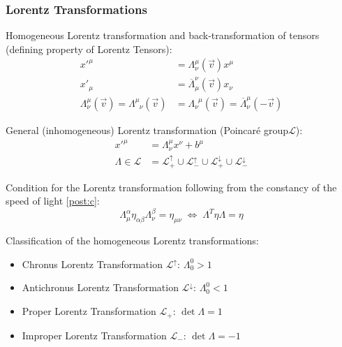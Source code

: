 		\subsubsection{Lorentz Transformations}
			\noindent
			Homogeneous Lorentz transformation and back-transformation of tensors (defining property of Lorentz Tensors):
			\begin{equation}
				\begin{aligned}
					x'^\mu &= \Lambda^{\mu}_{\nu}(\vec{v}) x^\mu \\
					x'_\mu &= \overline{\Lambda}_\mu^{\nu}(\vec{v}) x_\nu \\
					\Lambda^{\mu}_{\nu}(\vec{v}) = \Lambda^{\mu}_{\phantom{\mu}\nu}(\vec{v}) &= \Lambda^{\phantom{\nu}\mu}_{\nu}(\vec{v}) = \overline{\Lambda}^{\mu}_{\nu}(-\vec{v})
				\end{aligned}
			\end{equation}

			\noindent
			General (inhomogeneous) Lorentz transformation (Poincaré group$\mathcal{L}$): 
			\begin{equation}
				\begin{aligned}
					x'^\mu &= \Lambda^\mu_{\nu} x^\nu + b^\mu \\
					\Lambda \in \mathcal{L} &= \mathcal{L}^\uparrow_+ \cup \mathcal{L}^\uparrow_- \cup \mathcal{L}^\downarrow_+ \cup \mathcal{L}^\downarrow_-
				\end{aligned}
			\end{equation}

			\noindent
			Condition for the Lorentz transformation following from the constancy of the speed of light \ref{post:c}:
			\begin{equation}
				\Lambda^{\alpha}_{\mu} \eta_{\alpha\beta} \Lambda^{\beta}_{\nu} = \eta_{\mu\nu}
				 \;\Leftrightarrow\; \Lambda^T \eta \Lambda = \eta
			\end{equation}

			\noindent
			Classification of the homogeneous Lorentz transformations:
			\begin{itemize}
				\item Chronus Lorentz Transformation $\mathcal{L}^\uparrow$: $\Lambda^0_0 > 1$
				\item Antichronus Lorentz Transformation $\mathcal{L}^\downarrow$: $\Lambda^0_0 < 1$
				\item Proper Lorentz Transformation $\mathcal{L}_+$: $\det\Lambda = 1$
				\item Improper Lorentz Transformation $\mathcal{L}_-$: $\det\Lambda = -1$
			\end{itemize}

